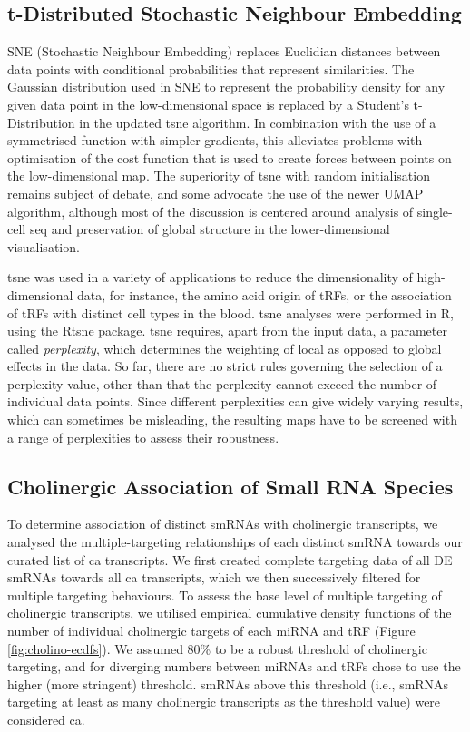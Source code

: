 \begin{method}
\subsection{t-Distributed Stochastic Neighbour Embedding} \label{sec:stroke:tsne}
SNE (Stochastic Neighbour Embedding) replaces Euclidian distances between data points with conditional probabilities that represent similarities. The Gaussian distribution used in SNE to represent the probability density for any given data point in the low-dimensional space is replaced by a Student's t-Distribution in the updated \ac{tsne} algorithm. In combination with the use of a symmetrised function with simpler gradients, this alleviates problems with optimisation of the cost function that is used to create forces between points on the low-dimensional map.\cite{Maaten2008} The superiority of \ac{tsne} with random initialisation remains subject of debate, and some advocate the use of the newer UMAP algorithm\cite{McInnes2018}, although most of the discussion is centered around analysis of single-cell \ac{seq} and preservation of global structure in the lower-dimensional visualisation.\cite{Becht2019}

\ac{tsne} was used in a variety of applications to reduce the dimensionality of high-dimensional data, for instance, the amino acid origin of tRFs, or the association of tRFs with distinct cell types in the blood. \ac{tsne} analyses were performed in R, using the Rtsne package.\cite{Krijthe2015} \ac{tsne} requires, apart from the input data, a parameter called \emph{perplexity}, which determines the weighting of local as opposed to global effects in the data. So far, there are no strict rules governing the selection of a perplexity value, other than that the perplexity cannot exceed the number of individual data points. Since different perplexities can give widely varying results, which can sometimes be misleading, the resulting maps have to be screened with a range of perplexities to assess their robustness.

\subsection{Cholinergic Association of Small RNA Species} \label{sec:stroke:chol-assoc}
To determine association of distinct smRNAs with cholinergic transcripts, we analysed the multiple-targeting relationships of each distinct smRNA towards our curated list of \ac{ca} transcripts. We first created complete targeting data of all DE smRNAs towards all \ac{ca} transcripts, which we then successively filtered for multiple targeting behaviours. To assess the base level of multiple targeting of cholinergic transcripts, we utilised empirical cumulative density functions of the number of individual cholinergic targets of each miRNA and tRF (Figure \ref{fig:cholino-ecdfs}). We assumed 80\% to be a robust threshold of cholinergic targeting, and for diverging numbers between miRNAs and tRFs chose to use the higher (more stringent) threshold. smRNAs above this threshold (i.e., smRNAs targeting at least as many cholinergic transcripts as the threshold value) were considered \ac{ca}.

\end{method}


